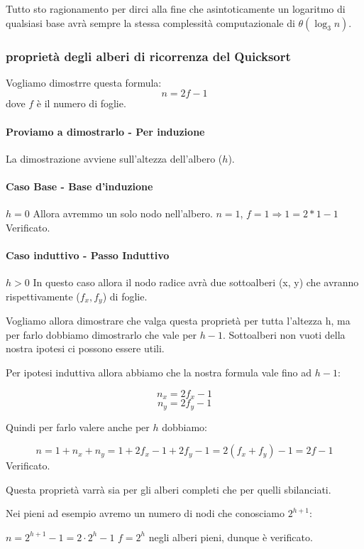 Tutto sto ragionamento per dirci alla fine che asintoticamente un logaritmo di qualsiasi base avrà sempre la stessa complessità computazionale di $\theta(\log_3 n)$.

\subsubsection{proprietà degli alberi di ricorrenza del Quicksort}

Vogliamo dimostrre questa formula:
$$n = 2f - 1$$ dove $f$ è il numero di foglie.

\paragraph{Proviamo a dimostrarlo - Per induzione}

La dimostrazione avviene sull'altezza dell'albero ($h$).

\paragraph{Caso Base - Base d'induzione}

$h = 0$ Allora avremmo un solo nodo nell'albero.
$n = 1$, $f = 1 \Rightarrow 1 = 2 * 1 - 1$ Verificato.

\paragraph{Caso induttivo - Passo Induttivo}

$h>0$ In questo caso allora il nodo radice avrà due sottoalberi (x, y) che avranno rispettivamente ($f_x, f_y$) di foglie.\smallskip

Vogliamo allora dimostrare che valga questa proprietà per tutta l'altezza h, ma per farlo dobbiamo dimostrarlo che vale per $h -1$. Sottoalberi non vuoti della nostra ipotesi ci possono essere utili.

Per ipotesi induttiva allora abbiamo che la nostra formula vale fino ad $h-1$:

$$n_x = 2f_x -1$$
$$n_y = 2f_y -1$$

Quindi per farlo valere anche per $h$ dobbiamo:

$$n = 1 + n_x + n_y = 1 + 2f_x -1 + 2f_y -1 = 2(f_x+f_y)-1 = 2f -1$$ Verificato.\medskip

Questa proprietà varrà sia per gli alberi completi che per quelli sbilanciati.

Nei pieni ad esempio avremo un numero di nodi che conosciamo $2^{h+1}$:\smallskip

$n = 2^{h+1} - 1 = 2\cdot 2^h -1$
$f = 2^h$ negli alberi pieni, dunque è verificato.




